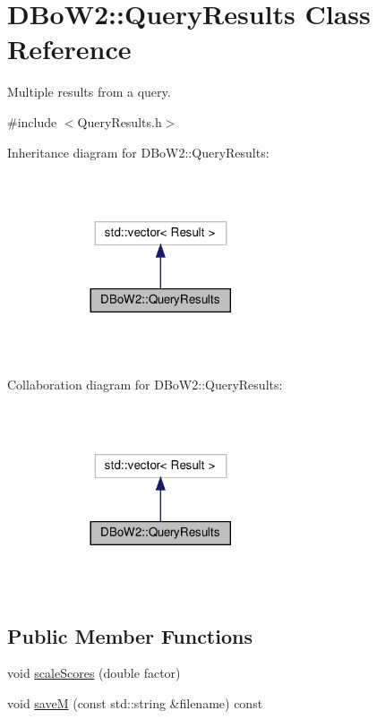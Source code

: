 \hypertarget{classDBoW2_1_1QueryResults}{}\section{D\+Bo\+W2\+:\+:Query\+Results Class Reference}
\label{classDBoW2_1_1QueryResults}


Multiple results from a query.  




{\ttfamily \#include $<$Query\+Results.\+h$>$}



Inheritance diagram for D\+Bo\+W2\+:\+:Query\+Results\+:\nopagebreak
\begin{figure}[H]
\begin{center}
\leavevmode
\includegraphics[width=197pt]{classDBoW2_1_1QueryResults__inherit__graph}
\end{center}
\end{figure}


Collaboration diagram for D\+Bo\+W2\+:\+:Query\+Results\+:\nopagebreak
\begin{figure}[H]
\begin{center}
\leavevmode
\includegraphics[width=197pt]{classDBoW2_1_1QueryResults__coll__graph}
\end{center}
\end{figure}
\subsection*{Public Member Functions}
\begin{DoxyCompactItemize}
\item 
void \hyperlink{classDBoW2_1_1QueryResults_aa47048267696191c070545c935e28b47}{scale\+Scores} (double factor)
\item 
void \hyperlink{classDBoW2_1_1QueryResults_adb484d12c8bf6d3428213fddcb65e699}{saveM} (const std\+::string \&filename) const
\end{DoxyCompactItemize}
